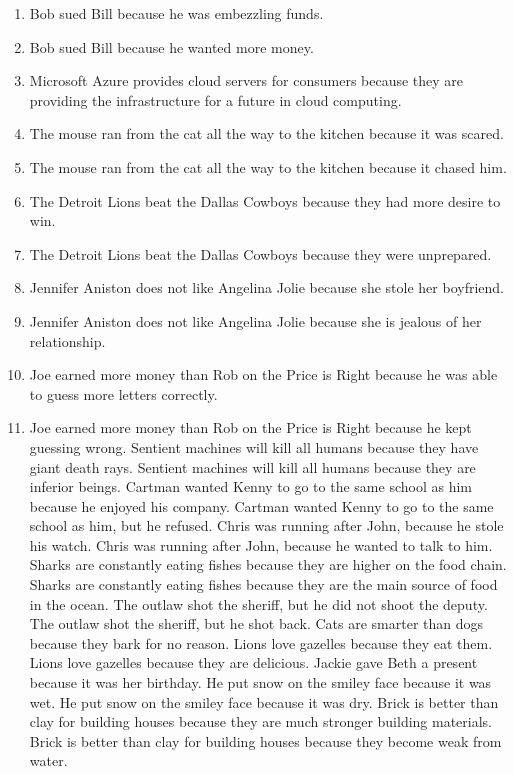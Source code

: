 \documentclass{article}
\begin{document}
\begin{enumerate}
	\item Bob sued Bill because he was embezzling funds.
	\item Bob sued Bill because he wanted more money.
	\item Microsoft Azure provides cloud servers for consumers because they are providing the infrastructure for a future in cloud computing.
	\item The mouse ran from the cat all the way to the kitchen because it was scared.
	\item The mouse ran from the cat all the way to the kitchen because it chased him.
	\item The Detroit Lions beat the Dallas Cowboys because they had more desire to win.
	\item The Detroit Lions beat the Dallas Cowboys because they were unprepared.
	\item Jennifer Aniston does not like Angelina Jolie because she stole her boyfriend.
	\item Jennifer Aniston does not like Angelina Jolie because she is jealous of her relationship.
	\item Joe earned more money than Rob on the Price is Right because he was able to guess more letters correctly.
	\item Joe earned more money than Rob on the Price is Right because he kept guessing wrong.
	Sentient machines will kill all humans because they have giant death rays.
	Sentient machines will kill all humans because they are inferior beings.
	Cartman wanted Kenny to go to the same school as him because he enjoyed his company.
	Cartman wanted Kenny to go to the same school as him, but he refused.
	Chris was running after John, because he stole his watch.
	Chris was running after John, because he wanted to talk to him.
	Sharks are constantly eating fishes because they are higher on the food chain.
	Sharks are constantly eating fishes because they are the main source of food in the ocean.
	The outlaw shot the sheriff, but he did not shoot the deputy.
	The outlaw shot the sheriff, but he shot back.
	Cats are smarter than dogs because they bark for no reason.
	Lions love gazelles because they eat them.
	Lions love gazelles because they are delicious.
	Jackie gave Beth a present because it was her birthday.
	He put snow on the smiley face because it was wet.
	He put snow on the smiley face because it was dry.
	Brick is better than clay for building houses because they are much stronger building materials.
	Brick is better than clay for building houses because they become weak from water.

\end{enumerate}
\end{document}
